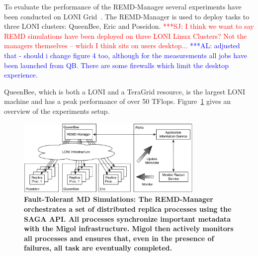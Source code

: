 \documentclass[times, 10pt, twocolumn]{article}
\newcommand{\alnote}[1]{ {\textcolor{blue} { ***AL: #1 }}}
\newcommand{\jhanote}[1]{ {\textcolor{red} { ***SJ: #1 }}}
\newcommand{\alnote}[1]{}
\newcommand{\jhanote}[1]{}
\begin{document}
\label{sec:exp}       
        
To evaluate the performance of the REMD-Manager several experiments
have been conducted on LONI Grid~\cite{Allen:2003xy}. The REMD-Manager
is used to deploy tasks to three LONI clusters: QueenBee,
Eric and Poseidon. 
\jhanote{I think we want to say REMD simulations
have been deployed on three LONI Linux Clusters? Not the managers
 themselves -- which I think sits on users desktop...} 
\alnote{adjusted that - should i change figure 4 too, 
although for the measurements all jobs have been launched from QB. There are 
some firewalls which limit the desktop experience.} 
 
QueenBee, which is both a LONI and a TeraGrid resource, is the largest LONI
machine and has a peak performance of over 50 TFlops.
Figure~\ref{fig:saga-taskfarming} gives an overview of the experiments
setup.

\begin{figure}[t]
    \centering
        \includegraphics[width=0.8\textwidth]{saga-taskfarming}
        \caption{\small \bf Fault-Tolerant MD Simulations: The
          REMD-Manager orchestrates a set of distributed replica
          processes using the SAGA API. All processes synchronize
          important metadata with the Migol infrastructure. Migol then
          actively monitors all processes and ensures that, even in
          the presence of failures, all task are eventually
          completed.}
    \label{fig:saga-taskfarming}
  \end{figure} 
\end{document}
